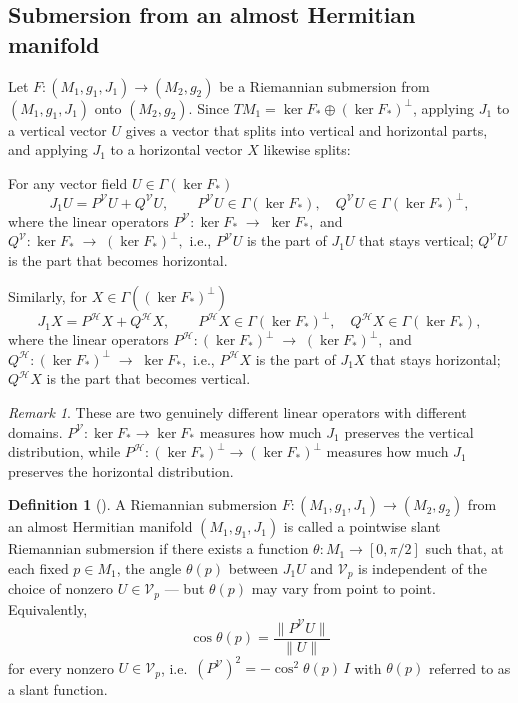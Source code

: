 \documentclass[11pt]{amsart}
\theoremstyle{plain}
\theoremstyle{definition}
\newtheorem{definition}[proposition]{Definition}
\theoremstyle{remark}
\newtheorem{remark}[proposition]{Remark}
\begin{document}
\subsection{ Submersion from an almost Hermitian manifold}
Let $F:(M_1,g_1,J_1)\to(M_2,g_2)$ be a Riemannian submersion from $(M_1,g_1,J_1)$ onto $(M_2,g_2)$.  Since $TM_1=\ker F_*\oplus
(\ker F_*)^\perp$, applying $J_1$ to a vertical vector $U$
gives a vector that splits into vertical and horizontal parts,
and applying $J_1$ to a horizontal vector $X$ likewise splits:

\medskip
For any vector field $U\in\Gamma(\ker F_*)$
\begin{equation}\label{eq:J_decomposition_vertical}
  J_1 U
  = P^{\mathcal{V}}U + Q^{\mathcal{V}}U,\qquad
  P^{\mathcal{V}}U\in\Gamma(\ker F_*),\quad
  Q^{\mathcal{V}}U\in\Gamma(\ker F_*)^{\perp},
\end{equation}
where the linear operators $P^{\mathcal{V}} : \ker F_*\;\to\; \ker F_*,$ and $Q^{\mathcal{V}} : \ker F_*\;\to\; (\ker F_*)^{\perp},$ i.e., $P^{\mathcal{V}}U$ is the part of $J_1 U$ that stays
vertical; $Q^{\mathcal{V}}U$ is the part that becomes
horizontal.
  

\medskip
Similarly, for $X\in\Gamma((\ker F_*)^{\perp})$
\begin{equation}\label{eq:J_decomposition_horizontal}
  J_1 X
  = P^{\mathcal{H}}X + Q^{\mathcal{H}}X,\qquad
  P^{\mathcal{H}}X\in\Gamma(\ker F_*)^{\perp},\quad
  Q^{\mathcal{H}}X\in\Gamma(\ker F_*),
\end{equation}
where the linear operators
 $ P^{\mathcal{H}} : (\ker F_*)^{\perp}
    \;\to\; (\ker F_*)^{\perp},$ and 
  $Q^{\mathcal{H}} : (\ker F_*)^{\perp}
    \;\to\; \ker F_*,$ i.e., 
$P^{\mathcal{H}}X$ is the part of $J_1 X$ that stays
horizontal; $Q^{\mathcal{H}}X$ is the part that becomes
vertical.

\begin{remark}
These are two genuinely different linear operators with
different domains.  $P^{\mathcal{V}}:\ker F_*\to\ker F_*$
measures how much $J_1$ preserves the vertical distribution,
while $P^{\mathcal{H}}:(\ker F_*)^\perp\to(\ker F_*)^\perp$
measures how much $J_1$ preserves the horizontal distribution.
\end{remark}

\begin{definition}[\cite{LeeSahin2014}]
\label{def:ps_subm_hermitian}
A Riemannian submersion $F:(M_1,g_1,J_1)\to(M_2,g_2)$ from an
almost Hermitian manifold $(M_1,g_1,J_1)$ is called a pointwise slant Riemannian submersion if there exists a function
$\theta:M_1\to[0,\pi/2]$ such that, at each fixed $p\in M_1$, the
angle $\theta(p)$ between $J_1U$ and $\mathcal{V}_p$ is independent
of the choice of nonzero $U\in\mathcal{V}_p$ --- but $\theta(p)$ may
vary from point to point. Equivalently,
\begin{equation*}
  \cos\theta(p) = \frac{\|P^{\mathcal{V}}U\|}{\|U\|}
\end{equation*}
for every nonzero $U\in\mathcal{V}_p$, i.e.\ ${(P^{\mathcal V})}^2=-\cos^2\theta(p)\,I$
with $\theta(p)$ referred to as a slant function.

\end{definition}
\end{document}
